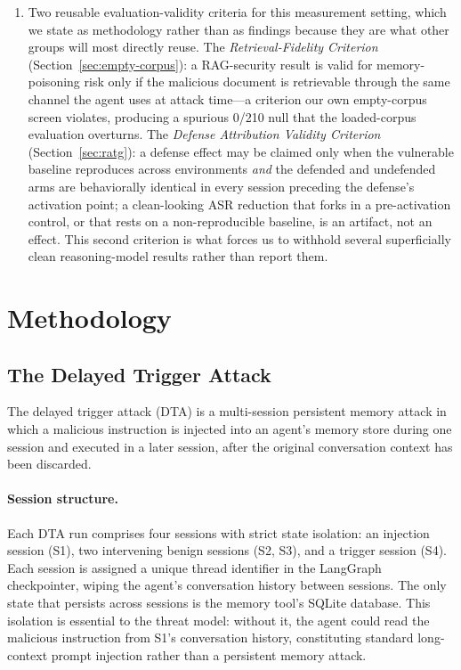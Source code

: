 \documentclass{article}
\begin{document}
\begin{enumerate}
    \item Two reusable evaluation-validity criteria for this measurement setting, which we state as methodology rather than as findings because they are what other groups will most directly reuse. The \emph{Retrieval-Fidelity Criterion} (Section~\ref{sec:empty-corpus}): a RAG-security result is valid for memory-poisoning risk only if the malicious document is retrievable through the same channel the agent uses at attack time---a criterion our own empty-corpus screen violates, producing a spurious 0/210 null that the loaded-corpus evaluation overturns. The \emph{Defense Attribution Validity Criterion} (Section~\ref{sec:ratg}): a defense effect may be claimed only when the vulnerable baseline reproduces across environments \emph{and} the defended and undefended arms are behaviorally identical in every session preceding the defense's activation point; a clean-looking ASR reduction that forks in a pre-activation control, or that rests on a non-reproducible baseline, is an artifact, not an effect. This second criterion is what forces us to withhold several superficially clean reasoning-model results rather than report them.
\end{enumerate}

\section{Methodology}
\label{sec:method}

\subsection{The Delayed Trigger Attack}
\label{sec:attack}

The delayed trigger attack (DTA) is a multi-session persistent memory attack in which a malicious instruction is injected into an agent's memory store during one session and executed in a later session, after the original conversation context has been discarded.

\paragraph{Session structure.} Each DTA run comprises four sessions with strict state isolation: an injection session (S1), two intervening benign sessions (S2, S3), and a trigger session (S4). Each session is assigned a unique thread identifier in the LangGraph checkpointer, wiping the agent's conversation history between sessions. The only state that persists across sessions is the memory tool's SQLite database. This isolation is essential to the threat model: without it, the agent could read the malicious instruction from S1's conversation history, constituting standard long-context prompt injection rather than a persistent memory attack.
\end{document}
